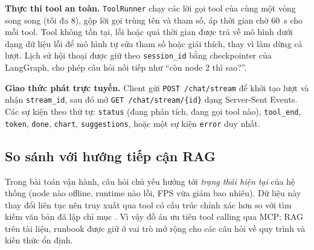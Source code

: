 \textbf{Thực thi tool an toàn.} \texttt{ToolRunner} chạy các lời gọi tool của cùng
một vòng song song (tối đa 8), gộp lời gọi trùng tên và tham số, áp thời gian chờ
60~s cho mỗi tool. Tool không tồn tại, lỗi hoặc quá thời gian được trả về mô hình
dưới dạng dữ liệu lỗi để mô hình tự sửa tham số hoặc giải thích, thay vì làm
dừng cả lượt. Lịch sử hội thoại được giữ theo \texttt{session\_id} bằng checkpointer
của LangGraph, cho phép câu hỏi nối tiếp như ``còn node 2 thì sao?''.

\textbf{Giao thức phát trực tuyến.} Client gửi \texttt{POST /chat/stream} để khởi
tạo lượt và nhận \texttt{stream\_id}, sau đó mở \texttt{GET /chat/stream/\{id\}}
dạng Server-Sent Events. Các sự kiện theo thứ tự: \texttt{status} (đang phân tích,
đang gọi tool nào), \texttt{tool\_end}, \texttt{token}, \texttt{done},
\texttt{chart}, \texttt{suggestions}, hoặc một sự kiện \texttt{error} duy nhất.

\subsection{So sánh với hướng tiếp cận RAG}

Trong bài toán vận hành, câu hỏi chủ yếu hướng tới \emph{trạng thái hiện tại}
của hệ thống (node nào offline, runtime nào lỗi, FPS vừa giảm bao nhiêu). Dữ
liệu này thay đổi liên tục nên truy xuất qua tool có cấu trúc chính xác hơn so
với tìm kiếm văn bản đã lập chỉ mục \cite{lewis2020rag}. Vì vậy đồ án ưu tiên
tool calling qua MCP; RAG trên tài liệu, runbook được giữ ở vai trò mở rộng cho
các câu hỏi về quy trình và kiến thức ổn định.
